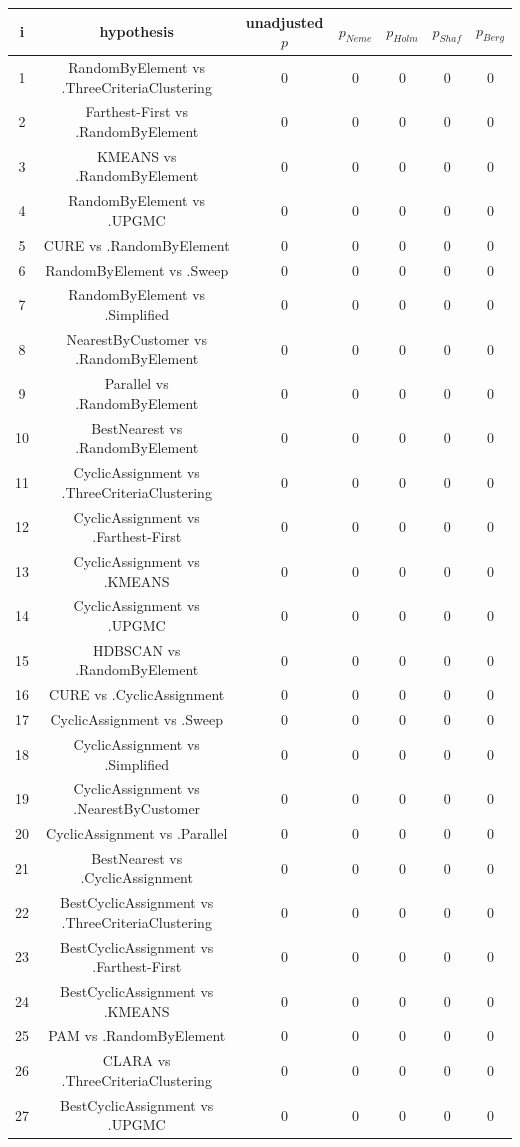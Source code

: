 \documentclass[a4paper,10pt]{article}
\begin{document}
\begin{landscape}
\begin{table}[!htp]
\centering\scriptsize
\begin{tabular}{ccccccc}
i&hypothesis&unadjusted $p$&$p_{Neme}$&$p_{Holm}$&$p_{Shaf}$&$p_{Berg}$\\
\hline1&RandomByElement vs .ThreeCriteriaClustering&0&0&0&0&0\\
2&Farthest-First vs .RandomByElement&0&0&0&0&0\\
3&KMEANS vs .RandomByElement&0&0&0&0&0\\
4&RandomByElement vs .UPGMC&0&0&0&0&0\\
5&CURE vs .RandomByElement&0&0&0&0&0\\
6&RandomByElement vs .Sweep&0&0&0&0&0\\
7&RandomByElement vs .Simplified&0&0&0&0&0\\
8&NearestByCustomer vs .RandomByElement&0&0&0&0&0\\
9&Parallel vs .RandomByElement&0&0&0&0&0\\
10&BestNearest vs .RandomByElement&0&0&0&0&0\\
11&CyclicAssignment vs .ThreeCriteriaClustering&0&0&0&0&0\\
12&CyclicAssignment vs .Farthest-First&0&0&0&0&0\\
13&CyclicAssignment vs .KMEANS&0&0&0&0&0\\
14&CyclicAssignment vs .UPGMC&0&0&0&0&0\\
15&HDBSCAN vs .RandomByElement&0&0&0&0&0\\
16&CURE vs .CyclicAssignment&0&0&0&0&0\\
17&CyclicAssignment vs .Sweep&0&0&0&0&0\\
18&CyclicAssignment vs .Simplified&0&0&0&0&0\\
19&CyclicAssignment vs .NearestByCustomer&0&0&0&0&0\\
20&CyclicAssignment vs .Parallel&0&0&0&0&0\\
21&BestNearest vs .CyclicAssignment&0&0&0&0&0\\
22&BestCyclicAssignment vs .ThreeCriteriaClustering&0&0&0&0&0\\
23&BestCyclicAssignment vs .Farthest-First&0&0&0&0&0\\
24&BestCyclicAssignment vs .KMEANS&0&0&0&0&0\\
25&PAM vs .RandomByElement&0&0&0&0&0\\
26&CLARA vs .ThreeCriteriaClustering&0&0&0&0&0\\
27&BestCyclicAssignment vs .UPGMC&0&0&0&0&0\\

\end{tabular}
\end{table}
\end{landscape}
\end{document}
